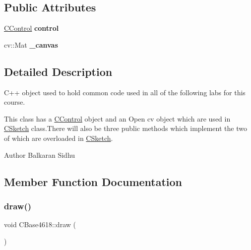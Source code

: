 \subsection*{Public Attributes}
\begin{DoxyCompactItemize}
\item 
\hypertarget{class_c_base4618_aa07dc8a46156de408c94acf90f46043a}{}\label{class_c_base4618_aa07dc8a46156de408c94acf90f46043a} 
\hyperlink{class_c_control}{C\+Control} {\bfseries control}
\item 
\hypertarget{class_c_base4618_a1b925f757247b33ca2072f777f24582d}{}\label{class_c_base4618_a1b925f757247b33ca2072f777f24582d} 
cv\+::\+Mat {\bfseries \+\_\+canvas}
\end{DoxyCompactItemize}


\subsection{Detailed Description}
C++ object used to hold common code used in all of the following labs for this course. 

This class has a \hyperlink{class_c_control}{C\+Control} object and an Open cv object which are used in \hyperlink{class_c_sketch}{C\+Sketch} class.\+There will also be three public methods which implement the two of which are overloaded in \hyperlink{class_c_sketch}{C\+Sketch}.

\begin{DoxyAuthor}{Author}
Balkaran Sidhu 
\end{DoxyAuthor}


\subsection{Member Function Documentation}
\hypertarget{class_c_base4618_a853327d563d064bb31db241861c4d291}{}\label{class_c_base4618_a853327d563d064bb31db241861c4d291} 
\subsubsection{\texorpdfstring{draw()}{draw()}}
{\footnotesize\ttfamily void C\+Base4618\+::draw (\begin{DoxyParamCaption}{ }\end{DoxyParamCaption})\hspace{0.3cm}{\ttfamily [virtual]}}



